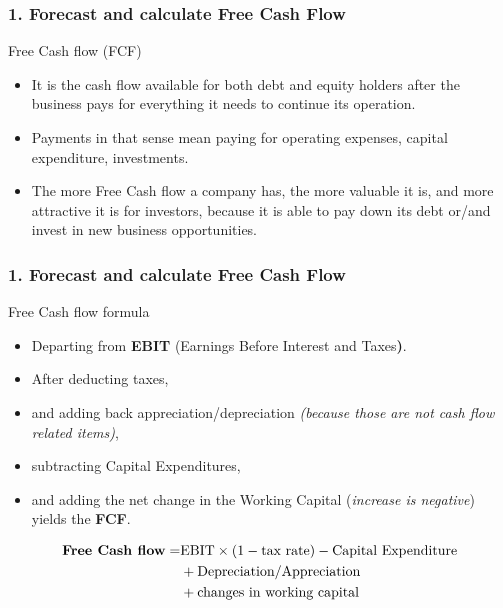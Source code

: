 \documentclass[serif, aspectratio=169]{beamer}
\begin{document}
\begin{frame}
	\frametitle<presentation>{1. Forecast and calculate Free Cash Flow}
\begin{block}{Free Cash flow (FCF)}
		\begin{itemize}
			\item It is the cash flow available for both debt and equity holders after the business pays for everything it needs to continue its operation.
			\item Payments in that sense mean paying for operating expenses, capital expenditure, investments.
			\item The more Free Cash flow a company has, the more valuable it is, and more attractive it is for investors, because it is able to pay down its debt or/and invest in new business opportunities.
    \end{itemize}
	\end{block}
\end{frame}

\begin{frame}
	\frametitle<presentation>{1. Forecast and calculate Free Cash Flow}
\begin{block}{Free Cash flow formula}
\begin{itemize}
    \item Departing from \textbf{EBIT }(Earnings Before Interest and Taxes\textbf{)}.
    \item After deducting taxes,
    \item and adding back appreciation/depreciation \textit{(because those are not cash flow related items)},
    \item subtracting Capital Expenditures, 
    \item and adding the net change in the Working Capital (\textit{increase is negative}) yields the \textbf{FCF}. 
\end{itemize}
\begin{align*}
\text{\textbf{Free Cash flow}} = & \text{EBIT} \times (1-\text{tax rate}) - \text{Capital Expenditure} \\
                        & + \text{Depreciation/Appreciation} \\
                        & + \text{changes in working capital}
\end{align*}
\end{block}
\end{frame}
\end{document}
